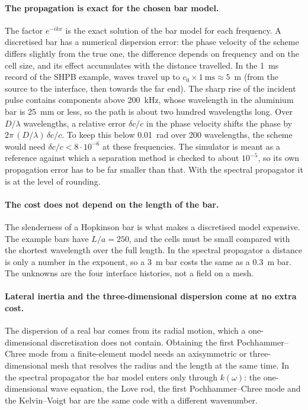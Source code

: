 \documentclass[11pt,a4paper,numbers=noenddot,abstract=true]{scrartcl}
\begin{document}
\paragraph{The propagation is exact for the chosen bar model.} The factor $e^{-ikx}$ is the exact solution of the
bar model for each frequency. A discretised bar has a numerical dispersion error: the phase velocity of the scheme
differs slightly from the true one, the difference depends on frequency and on the cell size, and its effect
accumulates with the distance travelled. In the 1~ms record of the SHPB example, waves travel up to
$c_0 \times 1~\mathrm{ms} \approx 5$~m (from the source to the interface, then towards the far end). The sharp
rise of the incident pulse contains components above 200~kHz, whose wavelength in the aluminium bar is 25~mm or
less, so the path is about two hundred wavelengths long. Over $D / \lambda$ wavelengths, a relative error
$\delta c / c$ in the phase velocity shifts the phase by $2\pi\, (D / \lambda)\, \delta c / c$. To keep this below
0.01~rad over 200 wavelengths, the scheme would need $\delta c / c < 8 \cdot 10^{-6}$ at these frequencies. The
simulator is meant as a reference against which a separation method is checked to about $10^{-5}$, so its own
propagation error has to be far smaller than that. With the spectral propagator it is at the level of rounding.

\paragraph{The cost does not depend on the length of the bar.} The slenderness of a Hopkinson bar is what makes a
discretised model expensive. The example bars have $L / a = 250$, and the cells must be small compared with the
shortest wavelength over the full length. In the spectral propagator a distance is only a number in the exponent,
so a 3~m bar costs the same as a 0.3~m bar. The unknowns are the four interface histories, not a field on a mesh.

\paragraph{Lateral inertia and the three-dimensional dispersion come at no extra cost.} The dispersion of a real
bar comes from its radial motion, which a one-dimensional discretisation does not contain. Obtaining the first
Pochhammer--Chree mode from a finite-element model needs an axisymmetric or three-dimensional mesh that resolves
the radius and the length at the same time. In the spectral propagator the bar model enters only through
$k(\omega)$: the one-dimensional wave equation, the Love rod, the first Pochhammer--Chree mode and the
Kelvin--Voigt bar are the same code with a different wavenumber.
\end{document}
